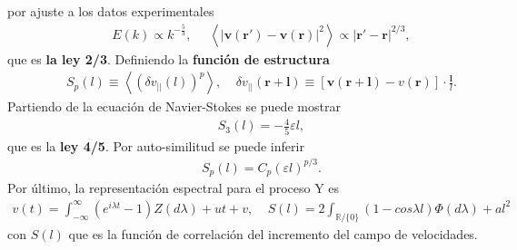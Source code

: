\documentclass[20pt,margin=1in,innermargin=-4.5in,blockverticalspace=-0.25in]{tikzposter}
\begin{document}
\begin{columns}
{        \vspace{-0.75cm}
        por ajuste a los datos experimentales
        \begin{align}
        E(k)\propto k^{-\frac{5}{3}}, \:\: \: \:\:\:     \left \langle |\boldsymbol{v}(\boldsymbol{r}')- \boldsymbol{v}(\boldsymbol{r})|^{2} \right \rangle\propto |\boldsymbol{r}'-\boldsymbol{r}|^{2/3},
            \label{7.6}
        \end{align}
        que es \textbf{la ley 2/3}. Definiendo la \textbf{función de estructura}
        \begin{align}
            S_p(l)\equiv \left \langle \left ( \delta v_{||}(l) \right )^{p} \right \rangle, \:\:\:\:\: \delta v_{||}(\boldsymbol{r+l})\equiv \left [ \boldsymbol{v}(\boldsymbol{r}+\boldsymbol{l})-v(\boldsymbol{r}) \right ]\cdot \frac{\boldsymbol{l}}{l}.
            \label{8.01}
        \end{align}
        Partiendo de la ecuación de Navier-Stokes se puede mostrar \cite{frisch1995turbulence}
        \begin{align}
            S_3(l)=-\frac{4}{5}\varepsilon l,
            \label{8.10}
        \end{align}
        que es la \textbf{ley 4/5}. Por auto-similitud se puede inferir \cite{birnir2013kolmogorov}
        \begin{align}
            S_p(l)=C_p(\varepsilon l)^{p/3}.
            \label{9.11}
        \end{align}
        Por último, la representación espectral para el proceso Y es 
        \begin{align}
            v(t) = \int_{-\infty}^{\infty}(e^{i\lambda t}-1) Z(d\lambda) + ut + v, \:\:\:\:\: S(l) = 2\int_{\mathbb{R}/ \{ 0\}} (1- cos\lambda l) \Phi(d\lambda) + al^2
        \end{align}
        con $S(l)$ que es la función de correlación del incremento del campo de velocidades.
    }
    
    \vspace{-0.1cm}
\end{columns}
\end{document}
